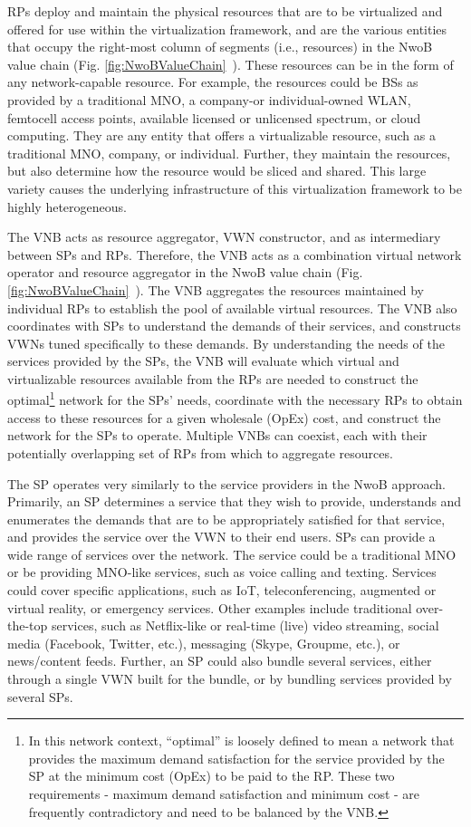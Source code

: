 \documentclass[12pt,dvipsnames]{report}
\begin{document}
RPs deploy and maintain the physical resources that are to be virtualized and offered for use within the virtualization framework, and are the various entities that occupy the right-most column of segments (i.e., resources) in the NwoB value chain (Fig. \ref{fig:NwoBValueChain}~\cite{6737248}).  These resources can be in the form of any network-capable resource.  For example, the resources could be BSs as provided by a traditional MNO, a company-or individual-owned WLAN, femtocell access points, available licensed or unlicensed spectrum, or cloud computing.  They are any entity that offers a virtualizable resource, such as a traditional MNO, company, or individual.  Further, they maintain the resources, but also determine how the resource would be sliced and shared.  This large variety causes the underlying infrastructure of this virtualization framework to be highly heterogeneous.

The VNB acts as resource aggregator, VWN constructor, and as intermediary between SPs and RPs.  Therefore, the VNB acts as a combination virtual network operator and resource aggregator in the NwoB value chain (Fig. \ref{fig:NwoBValueChain}~\cite{6737248}).  The VNB aggregates the resources maintained by individual RPs to establish the pool of available virtual resources.  The VNB also coordinates with SPs to understand the demands of their services, and constructs VWNs tuned specifically to these demands.  By understanding the needs of the services provided by the SPs, the VNB will evaluate which virtual and virtualizable resources available from the RPs are needed to construct the optimal\footnote{In this network context, ``optimal'' is loosely defined to mean a network that provides the maximum demand satisfaction for the service provided by the SP at the minimum cost (OpEx) to be paid to the RP.  These two requirements - maximum demand satisfaction and minimum cost - are frequently contradictory and need to be balanced by the VNB.} network for the SPs' needs, coordinate with the necessary RPs to obtain access to these resources for a given wholesale (OpEx) cost, and construct the network for the SPs to operate.  Multiple VNBs can coexist, each with their potentially overlapping set of RPs from which to aggregate resources.

The SP operates very similarly to the service providers in the NwoB approach.  Primarily, an SP determines a service that they wish to provide, understands and enumerates the demands that are to be appropriately satisfied for that service, and provides the service over the VWN to their end users.  SPs can provide a wide range of services over the network.  The service could be a traditional MNO or be providing MNO-like services, such as voice calling and texting.  Services could cover specific applications, such as IoT, teleconferencing, augmented or virtual reality, or emergency services.  Other examples include traditional over-the-top services, such as Netflix-like or real-time (live) video streaming, social media (Facebook, Twitter, etc.), messaging (Skype, Groupme, etc.), or news/content feeds.  Further, an SP could also bundle several services, either through a single VWN built for the bundle, or by bundling services provided by several SPs.
\end{document}
